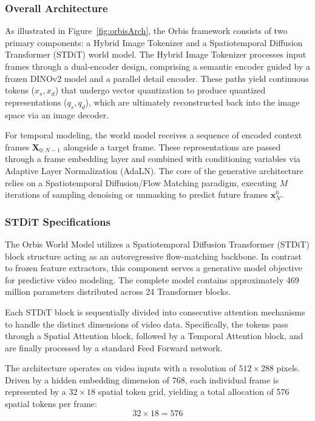 \documentclass{article}
\begin{document}
\subsubsection{Overall Architecture}
As illustrated in Figure~\ref{fig:orbisArch}, the Orbis framework consists of two primary components: a Hybrid Image Tokenizer and a Spatiotemporal Diffusion Transformer (STDiT) world model. The Hybrid Image Tokenizer processes input frames through a dual-encoder design, comprising a semantic encoder guided by a frozen DINOv2 model and a parallel detail encoder. These paths yield continuous tokens ($x_s, x_d$) that undergo vector quantization to produce quantized representations ($q_s, q_d$), which are ultimately reconstructed back into the image space via an image decoder. 

For temporal modeling, the world model receives a sequence of encoded context frames $\mathbf{X}_{0:N-1}$ alongside a target frame. These representations are passed through a frame embedding layer and combined with conditioning variables via Adaptive Layer Normalization (AdaLN). The core of the generative architecture relies on a Spatiotemporal Diffusion/Flow Matching paradigm, executing $M$ iterations of sampling denoising or unmasking to predict future frames $\mathbf{x}_N^0$.

\subsubsection{STDiT Specifications}
The Orbis World Model utilizes a Spatiotemporal Diffusion Transformer (STDiT) block structure acting as an autoregressive flow-matching backbone. In contrast to frozen feature extractors, this component serves a generative model objective for predictive video modeling. The complete model contains approximately 469 million parameters distributed across 24 Transformer blocks.

Each STDiT block is sequentially divided into consecutive attention mechanisms to handle the distinct dimensions of video data. Specifically, the tokens pass through a Spatial Attention block, followed by a Temporal Attention block, and are finally processed by a standard Feed Forward network. 

The architecture operates on video inputs with a resolution of $512 \times 288$ pixels. Driven by a hidden embedding dimension of 768, each individual frame is represented by a $32 \times 18$ spatial token grid, yielding a total allocation of 576 spatial tokens per frame:
\begin{equation}
32 \times 18 = 576
\end{equation}
\end{document}
